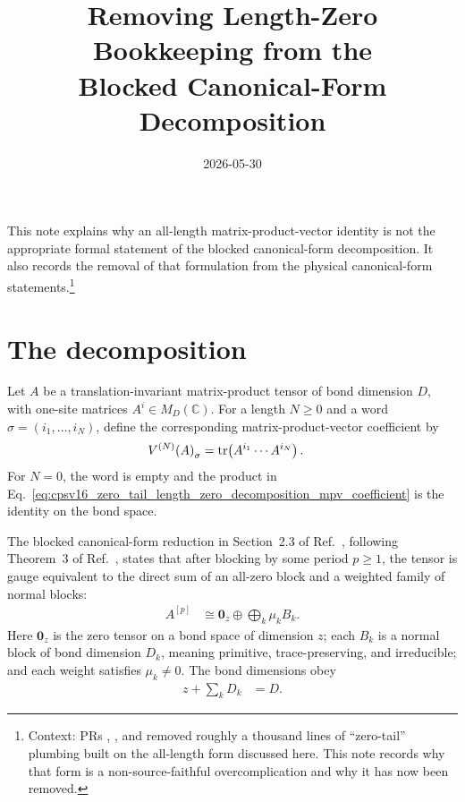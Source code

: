 \documentclass{article}
\title{Removing Length-Zero Bookkeeping from the\\
  Blocked Canonical-Form Decomposition}
\author{}
\date{2026-05-30}
\newcommand{\MPV}[2]{V^{(#1)}\!\left(#2\right)}
\begin{document}
\maketitle
{}

\noindent
This note explains why an all-length matrix-product-vector identity is not the
appropriate formal statement of the blocked canonical-form decomposition. It
also records the removal of that formulation from the physical canonical-form
statements.\footnote{%
  Context: PRs , , and  removed roughly a
  thousand lines of ``zero-tail'' plumbing built on the all-length form
  discussed here. This note records why that form is a non-source-faithful
  overcomplication and why it has now been removed.}

\section{The decomposition}

Let $A$ be a translation-invariant matrix-product tensor of bond dimension
$D$, with one-site matrices $A^i\in M_D(\mathbb C)$. For a length $N\geq0$
and a word $\sigma=(i_1,\ldots,i_N)$, define the corresponding
matrix-product-vector coefficient by
\begin{align}
    \MPV{N}{A}_\sigma
        &= \tr\!\left(A^{i_1}\cdots A^{i_N}\right).
    \label{eq:cpsv16_zero_tail_length_zero_decomposition_mpv_coefficient}
\end{align}
For $N=0$, the word is empty and the product in
Eq.~\ref{eq:cpsv16_zero_tail_length_zero_decomposition_mpv_coefficient} is the
identity on the bond space.

The blocked canonical-form reduction in Section~2.3 of
Ref.~\cite{Cirac2016MPDO_arXiv}, following Theorem~3 of
Ref.~\cite{PerezGarcia2007MPSReps}, states that after blocking by some period
$p\geq1$, the tensor is gauge equivalent to the direct sum of an all-zero
block and a weighted family of normal blocks:
\begin{align}
    A^{[p]}
        &\cong \mathbf 0_z\oplus\bigoplus_k\mu_k B_k.
    \label{eq:cpsv16_zero_tail_length_zero_decomposition_block_decomposition}
\end{align}
Here $\mathbf 0_z$ is the zero tensor on a bond space of dimension $z$; each
$B_k$ is a normal block of bond dimension $D_k$, meaning primitive,
trace-preserving, and irreducible; and each weight satisfies $\mu_k\neq0$.
The bond dimensions obey
\begin{align}
    z+\sum_k D_k
        &= D.
    \label{eq:cpsv16_zero_tail_length_zero_decomposition_bond_dimension}
\end{align}
\end{document}
